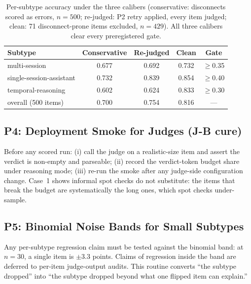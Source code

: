 \documentclass[11pt]{article}
\begin{document}
\begin{table}[h]
\centering\small
\begin{tabular}{@{}lcccc@{}}
\toprule
Subtype & Conservative & Re-judged & Clean & Gate \\
\midrule
multi-session & 0.677 & 0.692 & 0.732 & $\geq$0.35 \\
single-session-assistant & 0.732 & 0.839 & 0.854 & $\geq$0.40 \\
temporal-reasoning & 0.602 & 0.624 & 0.833 & $\geq$0.30 \\
\midrule
overall (500 items) & 0.700 & 0.754 & 0.816 & --- \\
\bottomrule
\end{tabular}
\caption{Per-subtype accuracy under the three calibers (conservative:
disconnects scored as errors, $n{=}500$; re-judged: P2 retry applied, every
item judged; clean: 71 disconnect-prone items excluded, $n{=}429$). All three
calibers clear every preregistered gate.}
\label{tab:calibers}
\end{table}

\subsection{P4: Deployment Smoke for Judges (J-B cure)}
Before any scored run: (i) call the judge on a realistic-size item and assert
the verdict is non-empty and parseable; (ii) record the verdict-token budget
share under reasoning mode; (iii) re-run the smoke after any judge-side
configuration change. Case~1 shows informal spot checks do not substitute:
the items that break the budget are systematically the long ones, which spot
checks under-sample.

\subsection{P5: Binomial Noise Bands for Small Subtypes}
Any per-subtype regression claim must be tested against the binomial band:
at $n=30$, a single item is $\pm 3.3$ points. Claims of regression inside the
band are deferred to per-item judge-output audits. This routine converts
``the subtype dropped'' into ``the subtype dropped beyond what one flipped
item can explain.''
\end{document}

